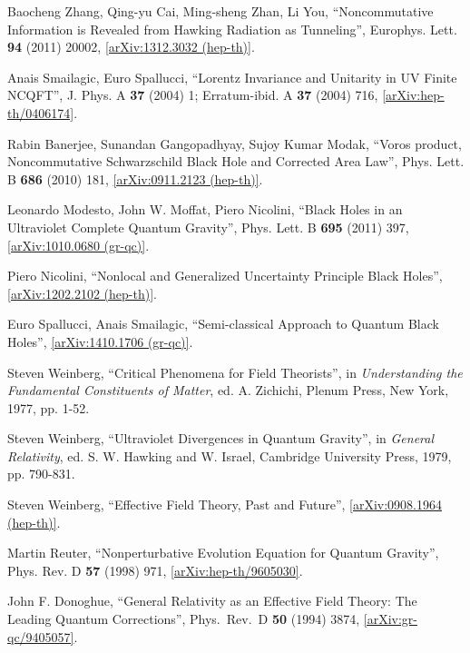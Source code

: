 \documentclass[12pt]{article}
\newcommand{\2}{$^2$}
\newcommand{\3}{$^3$}
\newcommand{\4}{$_4$}
\newcommand{\5}{$_5$}
\begin{document}
\begin{thebibliography}{400}
Baocheng Zhang, Qing-yu Cai, Ming-sheng Zhan, Li You, ``Noncommutative Information is Revealed from Hawking Radiation as Tunneling'', Europhys. Lett. \textbf{94} (2011) 20002, \href{http://arxiv.org/abs/1312.3032v1}{[arXiv:1312.3032 (hep-th)]}.

Anais Smailagic, Euro Spallucci, ``Lorentz Invariance and Unitarity in UV Finite NCQFT'', 
J. Phys. A \textbf{37} (2004) 1; Erratum-ibid. A \textbf{37} (2004) 716, \href{http://arxiv.org/abs/hep-th/0406174}{[arXiv:hep-th/0406174]}.

Rabin Banerjee, Sunandan Gangopadhyay, Sujoy Kumar Modak, 
``Voros product, Noncommutative Schwarzschild Black Hole and Corrected Area Law'',
Phys. Lett. B \textbf{686} (2010) 181,
\href{http://arxiv.org/abs/0911.2123}{[arXiv:0911.2123 (hep-th)]}.

Leonardo Modesto, John W. Moffat, Piero Nicolini,
``Black Holes in an Ultraviolet Complete Quantum Gravity'', Phys. Lett. B \textbf{695} (2011) 397, \href{http://arxiv.org/abs/1010.0680}{[arXiv:1010.0680 (gr-qc)]}.

	
Piero Nicolini, ``Nonlocal and Generalized Uncertainty Principle Black Holes'', \href{http://arxiv.org/abs/1202.2102}{[arXiv:1202.2102 (hep-th)]}.

Euro Spallucci, Anais Smailagic, ``Semi-classical Approach to Quantum Black Holes'', \href{http://arxiv.org/abs/1410.1706}{[arXiv:1410.1706 (gr-qc)]}.


Steven Weinberg, ``Critical Phenomena for Field Theorists'', in \emph{Understanding the Fundamental Constituents of Matter}, ed. A. Zichichi, Plenum Press, New
York, 1977, pp. 1-52.

Steven Weinberg, ``Ultraviolet Divergences in Quantum Gravity'', in \emph{General Relativity}, ed. S. W. Hawking and W. Israel, Cambridge University Press, 1979, pp. 790-831.

Steven Weinberg, ``Effective Field Theory, Past and Future'', \href{http://arxiv.org/abs/0908.1964}{[arXiv:0908.1964 (hep-th)]}.

Martin Reuter, ``Nonperturbative Evolution Equation for Quantum Gravity'', Phys. Rev. D \textbf{57} (1998) 971, \href{http://arxiv.org/abs/hep-th/9605030}{[arXiv:hep-th/9605030]}.

  John F. Donoghue,
  ``General Relativity as an Effective Field Theory: The Leading Quantum Corrections'',
  Phys.\ Rev.\ D {\bf 50}  (1994) 3874,
  \href{http://arxiv.org/abs/gr-qc/9405057}{[arXiv:gr-qc/9405057]}.


\end{thebibliography}
\end{document}
